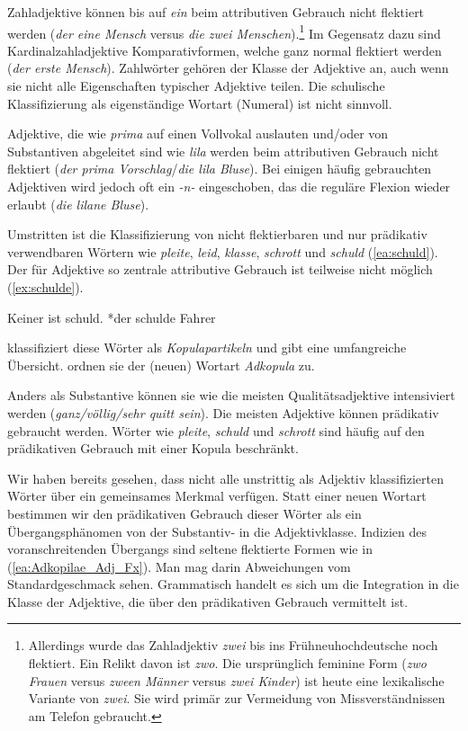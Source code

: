 Zahladjektive können bis auf \textit{ein} beim attributiven Gebrauch nicht flektiert werden (\textit{der eine Mensch} versus \textit{die zwei Menschen}).\footnote{Allerdings wurde das Zahladjektiv \textit{zwei} bis ins Frühneuhochdeutsche noch flektiert. Ein Relikt davon ist \textit{zwo}. Die ursprünglich feminine Form (\textit{zwo Frauen} versus \textit{zween Männer} versus \textit{zwei Kinder}) ist heute eine lexikalische Variante von \textit{zwei}. Sie wird primär zur Vermeidung von Missverständnissen am Telefon gebraucht.} Im Gegensatz dazu sind Kardinalzahladjektive Komparativformen, welche ganz normal flektiert werden (\textit{der erste Mensch}). Zahlwörter gehören der Klasse der Adjektive an, auch wenn sie nicht alle Eigenschaften typischer Adjektive teilen. Die schulische Klassifizierung als eigenständige Wortart (Numeral) ist nicht sinnvoll.

Adjektive, die wie \textit{prima} auf einen Vollvokal auslauten und/oder von Substantiven abgeleitet sind wie \textit{lila} werden beim attributiven Gebrauch nicht flektiert (\textit{der prima Vorschlag}/\textit{die lila Bluse}). Bei einigen häufig gebrauchten Adjektiven wird jedoch oft ein \textit{-n-} eingeschoben, das die reguläre Flexion wieder erlaubt (\textit{die lilane Bluse}).  

Umstritten ist die Klassifizierung von nicht flektierbaren und nur prädikativ verwendbaren Wörtern wie \textit{pleite}, \textit{leid}, \textit{klasse}, \textit{schrott} und \textit{schuld} (\ref{ea:schuld}). Der für Adjektive so zentrale attributive Gebrauch ist teilweise nicht möglich (\ref{ex:schulde}).   

\ea \label{ea:Adkopula_Adj}
\ea \label{ea:schuld} Keiner ist schuld.
\ex \label{ex:schulde} *der schulde Fahrer
\z 
\z 

\citet[767--777]{Engel2009} klassifiziert diese Wörter als \textit{Kopulapartikeln} und gibt eine umfangreiche Übersicht. \citet[55]{ZifHoffStr1997} ordnen sie der (neuen) Wortart \textit{Adkopula} zu. 

Anders als Substantive können sie wie die meisten Qualitätsadjektive intensiviert werden (\textit{ganz/völlig/sehr quitt sein}). Die meisten Adjektive können prädikativ gebraucht werden. Wörter wie \textit{pleite}, \textit{schuld} und \textit{schrott} sind häufig auf den prädikativen Gebrauch mit einer Kopula beschränkt. 

Wir haben bereits gesehen, dass nicht alle unstrittig als Adjektiv klassifizierten Wörter über ein gemeinsames Merkmal verfügen. Statt einer neuen Wortart bestimmen wir den prädikativen Gebrauch dieser Wörter als ein Übergangsphänomen von der Substantiv- in die Adjektivklasse. Indizien des voranschreitenden Übergangs sind seltene flektierte Formen wie in (\ref{ea:Adkopilae_Adj_Fx}). Man mag darin Abweichungen vom Standardgeschmack sehen. Grammatisch handelt es sich um die Integration in die Klasse der Adjektive, die über den prädikativen Gebrauch vermittelt ist.

